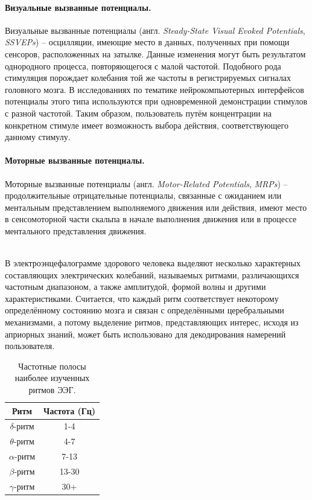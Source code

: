\documentclass[12pt,a4paper,oneside,fleqn,leqno]{article}
\newcounter{pe} %
\newcommand*{\Nep}{\addtocounter{pe}{1}{\arabic{pe}$^{\circ}$.\;}}
\newcommand*{\NepS}{\mbox{} \\ \Nep}
\begin{document}
	\paragraph{Визуальные вызванные потенциалы.}
	\par Визуальные вызванные потенциалы (англ. {\it Steady-State Visual Evoked Potentials}, {\it SSVEPs}) -- осцилляции, имеющие место в данных, полученных при помощи сенсоров, расположенных на затылке. Данные изменения могут быть результатом однородного процесса, повторяющегося с малой частотой. Подобного рода стимуляция порождает колебания той же частоты в регистрируемых сигналах головного мозга. В исследованиях по тематике нейрокомпьютерных интерфейсов потенциалы этого типа используются при одновременной демонстрации стимулов с разной частотой. Таким образом, пользователь путём концентрации на конкретном стимуле имеет возможность выбора действия, соответствующего данному стимулу.\\
	\paragraph{Моторные вызванные потенциалы.}
	\par Моторные вызванные потенциалы (англ. {\it Motor-Related Potentials}, {\it MRPs}) -- продолжительные отрицательные потенциалы, связанные с ожиданием или ментальным представлением выполняемого движения или действия, имеют место в сенсомоторной части скальпа в начале выполнения движения или в процессе ментального представления движения.
	\\ \NepS {\bf Частотная мозговая активность}
	\par В электроэнцефалограмме здорового человека выделяют несколько характерных составляющих электрических колебаний, называемых ритмами, различающихся частотным диапазоном, а также амплитудой, формой волны и другими характеристиками. Считается, что каждый ритм соответствует некоторому определённому состоянию мозга и связан с определёнными церебральными механизмами, а потому выделение ритмов, представляющих интерес, исходя из априорных знаний, может быть использовано для декодирования намерений пользователя.

\begin{table}[h]
\centering
\begin{tabular}{|c|c|}
\hline
Ритм & Частота (Гц) \\ \hline
$\delta$-ритм & 1-4 \\ \hline
$\theta$-ритм & 4-7 \\ \hline
$\alpha$-ритм & 7-13 \\ \hline
$\beta$-ритм & 13-30 \\ \hline
$\gamma$-ритм &  30+ \\ \hline
\end{tabular}
\caption{Частотные полосы наиболее изученных ритмов ЭЭГ.}
\end{table}
\end{document}
